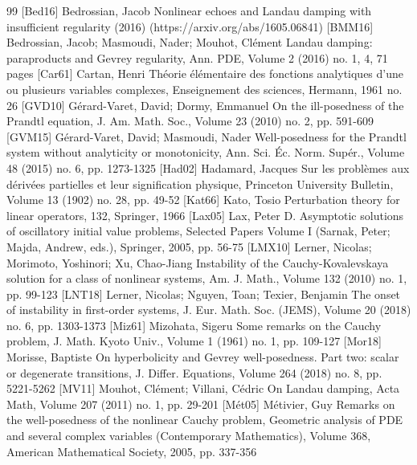 \begin{thebibliography}{99}
 [Bed16] Bedrossian, Jacob Nonlinear echoes and Landau damping with insufficient regularity (2016) (https://arxiv.org/abs/1605.06841)
 [BMM16] Bedrossian, Jacob; Masmoudi, Nader; Mouhot, Clément Landau damping: paraproducts and Gevrey regularity, Ann. PDE, Volume 2 (2016) no. 1, 4, 71 pages
 [Car61] Cartan, Henri Théorie élémentaire des fonctions analytiques d’une ou plusieurs variables complexes, Enseignement des sciences, Hermann, 1961 no. 26
 [GVD10] Gérard-Varet, David; Dormy, Emmanuel On the ill-posedness of the Prandtl equation, J. Am. Math. Soc., Volume 23 (2010) no. 2, pp. 591-609
 [GVM15] Gérard-Varet, David; Masmoudi, Nader Well-posedness for the Prandtl system without analyticity or monotonicity, Ann. Sci. Éc. Norm. Supér., Volume 48 (2015) no. 6, pp. 1273-1325
 [Had02] Hadamard, Jacques Sur les problèmes aux dérivées partielles et leur signification physique, Princeton University Bulletin, Volume 13 (1902) no. 28, pp. 49-52
 [Kat66] Kato, Tosio Perturbation theory for linear operators, 132, Springer, 1966
 [Lax05] Lax, Peter D. Asymptotic solutions of oscillatory initial value problems, Selected Papers Volume I (Sarnak, Peter; Majda, Andrew, eds.), Springer, 2005, pp. 56-75
 [LMX10] Lerner, Nicolas; Morimoto, Yoshinori; Xu, Chao-Jiang Instability of the Cauchy-Kovalevskaya solution for a class of nonlinear systems, Am. J. Math., Volume 132 (2010) no. 1, pp. 99-123
 [LNT18] Lerner, Nicolas; Nguyen, Toan; Texier, Benjamin The onset of instability in first-order systems, J. Eur. Math. Soc. (JEMS), Volume 20 (2018) no. 6, pp. 1303-1373
 [Miz61] Mizohata, Sigeru Some remarks on the Cauchy problem, J. Math. Kyoto Univ., Volume 1 (1961) no. 1, pp. 109-127
 [Mor18] Morisse, Baptiste On hyperbolicity and Gevrey well-posedness. Part two: scalar or degenerate transitions, J. Differ. Equations, Volume 264 (2018) no. 8, pp. 5221-5262
 [MV11] Mouhot, Clément; Villani, Cédric On Landau damping, Acta Math, Volume 207 (2011) no. 1, pp. 29-201
 [Mét05] Métivier, Guy Remarks on the well-posedness of the nonlinear Cauchy problem, Geometric analysis of PDE and several complex variables (Contemporary Mathematics), Volume 368, American Mathematical Society, 2005, pp. 337-356

\end{thebibliography}
